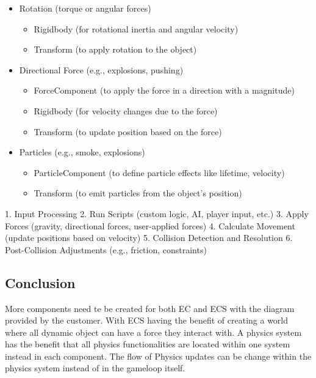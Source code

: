 \documentclass{projdoc}
\begin{document}
\begin{itemize}
    \item Rotation (torque or angular forces)
    \begin{itemize}
        \item Rigidbody (for rotational inertia and angular velocity)
        \item Transform (to apply rotation to the object)
    \end{itemize}

    \item Directional Force (e.g., explosions, pushing)
    \begin{itemize}
        \item ForceComponent (to apply the force in a direction with a magnitude)
        \item Rigidbody (for velocity changes due to the force)
        \item Transform (to update position based on the force)
    \end{itemize}

    \item Particles (e.g., smoke, explosions)
    \begin{itemize}
        \item ParticleComponent (to define particle effects like lifetime, velocity)
        \item Transform (to emit particles from the object’s position)
    \end{itemize}
\end{itemize}


1. Input Processing
2. Run Scripts (custom logic, AI, player input, etc.)
3. Apply Forces (gravity, directional forces, user-applied forces)
4. Calculate Movement (update positions based on velocity)
5. Collision Detection and Resolution
6. Post-Collision Adjustments (e.g., friction, constraints)


\subsection{Conclusion}

More components need te be created for both EC and ECS with the diagram provided by
the customer. With ECS having the benefit of creating a world where all dynamic
object can have a force they interact with. A physics system has the benefit that all
physics functionalities are located within one system instead in each component. The
flow of Physics updates can be change within the physics system instead of in the
gameloop itself.
\end{document}
